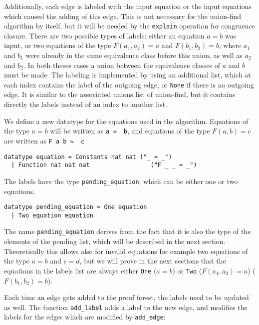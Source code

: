 Additionally, each edge is labeled with the input equation or the input equations which caused the adding of this edge. This is not necessary for the union-find algorithm by itself, but it will be needed by the \lstinline{explain} operation for congruence closure. There are two possible types of labels: either an equation $a = b$ was input, or two equations of the type $F(a_1, a_2) = a$ and $F(b_1, b_2) = b$, where $a_1$ and $b_1$ were already in the same equivalence class before this union, as well as $a_2$ and $b_2$. In both theses cases a union between the equivalence classes of $a$ and $b$ must be made. The labeling is implemented by using an additional list, which at each index contains the label of the outgoing edge, or \lstinline{None} if there is no outgoing edge. It is similar to the associated unions list of union-find, but it contains directly the labels instead of an index to another list.

We define a new datatype for the equations used in the algorithm. Equations of the type $a = b$ will be written as \lstinline{a ≈  b}, and equations of the type $F(a, b) = c$ are written as \lstinline{F a b ≈  c}

\begin{lstlisting}
datatype equation = Constants nat nat ("_ ≈ _")
  | Function nat nat nat                 ("F _ _ ≈ _")
\end{lstlisting}

The labels have the type \lstinline{pending_equation}, which can be either one or two equations.

\begin{lstlisting}
datatype pending_equation = One equation
  | Two equation equation
\end{lstlisting}

The name \lstinline{pending_equation} derives from the fact that it is also the type of the elements of the pending list, which will be described in the next section. Theoretically this allows also for invalid equations for example two equations of the type $a = b$ and $c = d$, but we will prove in the next sections that the equations in the labels list are always either \lstinline{One} ($a = b$) or \lstinline{Two} ($F(a_1, a_2) = a$) ($F(b_1, b_2) = b$).

Each time an edge gets added to the proof forest, the labels need to be updated as well. The function \lstinline{add_label} adds a label to the new edge, and modifies the labels for the edges which are modified by \lstinline{add_edge}:


